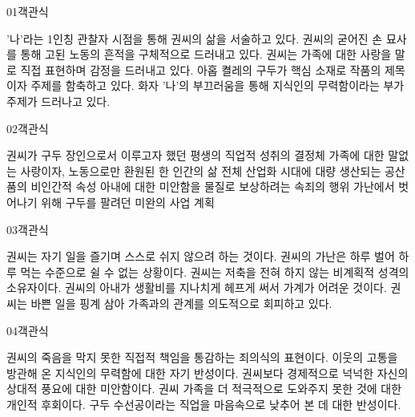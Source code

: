 \documentclass[fs85,seriesWit]{korfarm-base}
\begin{document}
\kfBeginMC
\begin{kfQBlock}{01}{객관식}
\begin{kfChoices}
\kfChoice '나'라는 1인칭 관찰자 시점을 통해 권씨의 삶을 서술하고 있다.
\kfChoice 권씨의 굳어진 손 묘사를 통해 고된 노동의 흔적을 구체적으로 드러내고 있다.
\kfChoice 권씨는 가족에 대한 사랑을 말로 직접 표현하며 감정을 드러내고 있다.
\kfChoice 아홉 켤레의 구두가 핵심 소재로 작품의 제목이자 주제를 함축하고 있다.
\kfChoice 화자 '나'의 부끄러움을 통해 지식인의 무력함이라는 부가 주제가 드러나고 있다.
\end{kfChoices}
\end{kfQBlock}

\begin{kfQBlock}{02}{객관식}
\begin{kfChoices}
\kfChoice 권씨가 구두 장인으로서 이루고자 했던 평생의 직업적 성취의 결정체
\kfChoice 가족에 대한 말없는 사랑이자, 노동으로만 환원된 한 인간의 삶 전체
\kfChoice 산업화 시대에 대량 생산되는 공산품의 비인간적 속성
\kfChoice 아내에 대한 미안함을 물질로 보상하려는 속죄의 행위
\kfChoice 가난에서 벗어나기 위해 구두를 팔려던 미완의 사업 계획
\end{kfChoices}
\end{kfQBlock}

\begin{kfQBlock}{03}{객관식}
\begin{kfChoices}
\kfChoice 권씨는 자기 일을 즐기며 스스로 쉬지 않으려 하는 것이다.
\kfChoice 권씨의 가난은 하루 벌어 하루 먹는 수준으로 쉴 수 없는 상황이다.
\kfChoice 권씨는 저축을 전혀 하지 않는 비계획적 성격의 소유자이다.
\kfChoice 권씨의 아내가 생활비를 지나치게 헤프게 써서 가계가 어려운 것이다.
\kfChoice 권씨는 바쁜 일을 핑계 삼아 가족과의 관계를 의도적으로 회피하고 있다.
\end{kfChoices}
\end{kfQBlock}

\begin{kfQBlock}{04}{객관식}
\begin{kfChoices}
\kfChoice 권씨의 죽음을 막지 못한 직접적 책임을 통감하는 죄의식의 표현이다.
\kfChoice 이웃의 고통을 방관해 온 지식인의 무력함에 대한 자기 반성이다.
\kfChoice 권씨보다 경제적으로 넉넉한 자신의 상대적 풍요에 대한 미안함이다.
\kfChoice 권씨 가족을 더 적극적으로 도와주지 못한 것에 대한 개인적 후회이다.
\kfChoice 구두 수선공이라는 직업을 마음속으로 낮추어 본 데 대한 반성이다.
\end{kfChoices}
\end{kfQBlock}
\end{document}
